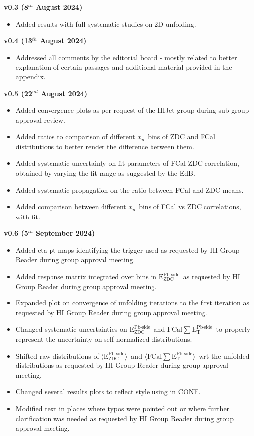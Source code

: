 \documentclass[NOTE, atlasdraft=true, texlive=2020, UKenglish]{atlasdoc}
\newcommand{\AZDC}{$\langle \text{E}_\text{ZDC}^\text{Pb-side} \rangle$}
\newcommand{\EZDC}{$\text{E}_\text{ZDC}^\text{Pb-side}$}
\newcommand{\EATPB}{$\langle \text{FCal} \sum \text{E}_{\text{T}}^{\text{Pb-side} } \rangle$}
\newcommand{\ETPB}{$\text{FCal} \sum \text{E}_{\text{T}}^{\text{Pb-side} }$}
\newcommand{\xp}{$x_{p}$}
\begin{document}
\textbf{v0.3 (8$^{th}$ August 2024)}
\begin{itemize}
    \item Added results with full systematic studies on 2D unfolding. 
\end{itemize}
\textbf{v0.4 (13$^{th}$ August 2024)}
\begin{itemize}
    \item Addressed all comments by the editorial board - mostly related to better explanation of certain passages and additional material provided in the appendix. 
\end{itemize}
\textbf{v0.5 (22$^{nd}$ August 2024)}
\begin{itemize}
    \item Added convergence plots as per request of the HIJet group during sub-group approval review. 
    \item Added ratios to comparison of different \xp\ bins of ZDC and FCal distributions to better render the difference between them. 
    \item Added systematic uncertainty on fit parameters of FCal-ZDC correlation, obtained by varying the fit range as suggested by the EdB. 
    \item Added systematic propagation on the ratio between FCal and ZDC means. 
    \item Added comparison between different \xp\ bins of FCal vs ZDC correlations, with fit. 
\end{itemize}
\textbf{v0.6 (5$^{th}$ September 2024)}
\begin{itemize}
    \item Added eta-pt maps identifying the trigger used as requested by HI Group Reader during group approval meeting.
    \item Added response matrix integrated over bins in \EZDC\ as requested by HI Group Reader during group approval meeting. 
    \item Expanded plot on convergence of unfolding iterations to the first iteration as requested by HI Group Reader during group approval meeting.
    \item Changed systematic uncertainties on \EZDC\ and \ETPB\ to properly represent the uncertainty on self normalized distributions. 
    \item Shifted raw distributions of \AZDC\ and \EATPB\ wrt the unfolded distributions as requested by HI Group Reader during group approval meeting.
    \item Changed several results plots to reflect style using in CONF. 
    \item Modified text in places where typos were pointed out or where further clarification was needed as requested by HI Group Reader during group approval meeting.
\end{itemize}
\end{document}
